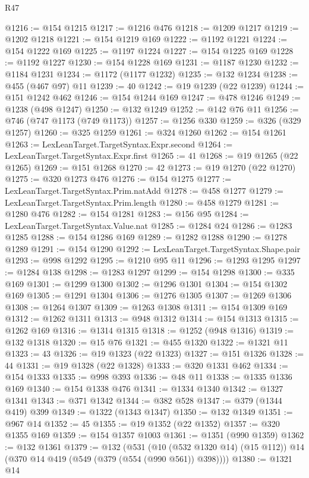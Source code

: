 \begin{lexlean}{R47}
\begin{coremodule}
@1216 := @154 @1215
@1217 := @1216 @476
@1218 := @1209 @1217
@1219 := @1202 @1218
@1221 := @154 @1219 @169
@1222 := @1192 @1221
@1224 := @154 @1222 @169
@1225 := @1197 @1224
@1227 := @154 @1225 @169
@1228 := @1192 @1227
@1230 := @154 @1228 @169
@1231 := @1187 @1230
@1232 := @1184 @1231
@1234 := @1172 (@1177 @1232)
@1235 := @132 @1234
@1238 := @455 (@467 @97) @11
@1239 := 40
@1242 := @19 @1239 (@22 @1239)
@1244 := @151 @1242 @462
@1246 := @154 @1244 @169
@1247 := @478 @1246
@1249 := @1238 (@498 @1247)
@1250 := @132 @1249
@1252 := @142 @76 @11
@1256 := @746 (@747 @1173 (@749 @1173))
@1257 := @1256 @330
@1259 := @326 (@329 @1257)
@1260 := @325 @1259
@1261 := @324 @1260
@1262 := @154 @1261
@1263 := LexLeanTarget.TargetSyntax.Expr.second
@1264 := LexLeanTarget.TargetSyntax.Expr.first
@1265 := 41
@1268 := @19 @1265 (@22 @1265)
@1269 := @151 @1268
@1270 := 42
@1273 := @19 @1270 (@22 @1270)
@1275 := @320 @1273 @476
@1276 := @154 @1275
@1277 := LexLeanTarget.TargetSyntax.Prim.natAdd
@1278 := @458 @1277
@1279 := LexLeanTarget.TargetSyntax.Prim.length
@1280 := @458 @1279
@1281 := @1280 @476
@1282 := @154 @1281
@1283 := @156 @95
@1284 := LexLeanTarget.TargetSyntax.Value.nat
@1285 := @1284 @24
@1286 := @1283 @1285
@1288 := @154 @1286 @169
@1289 := @1282 @1288
@1290 := @1278 @1289
@1291 := @154 @1290
@1292 := LexLeanTarget.TargetSyntax.Shape.pair
@1293 := @998 @1292
@1295 := @1210 @95 @11
@1296 := @1293 @1295
@1297 := @1284 @138
@1298 := @1283 @1297
@1299 := @154 @1298
@1300 := @335 @169
@1301 := @1299 @1300
@1302 := @1296 @1301
@1304 := @154 @1302 @169
@1305 := @1291 @1304
@1306 := @1276 @1305
@1307 := @1269 @1306
@1308 := @1264 @1307
@1309 := @1263 @1308
@1311 := @154 @1309 @169
@1312 := @1262 @1311
@1313 := @948 @1312
@1314 := @154 @1313
@1315 := @1262 @169
@1316 := @1314 @1315
@1318 := @1252 (@948 @1316)
@1319 := @132 @1318
@1320 := @15 @76
@1321 := @455 @1320
@1322 := @1321 @11
@1323 := 43
@1326 := @19 @1323 (@22 @1323)
@1327 := @151 @1326
@1328 := 44
@1331 := @19 @1328 (@22 @1328)
@1333 := @320 @1331 @462
@1334 := @154 @1333
@1335 := @998 @393
@1336 := @48 @11
@1338 := @1335 @1336 @169
@1340 := @154 @1338 @476
@1341 := @1334 @1340
@1342 := @1327 @1341
@1343 := @371 @1342
@1344 := @382 @528
@1347 := @379 (@1344 @419) @399
@1349 := @1322 (@1343 @1347)
@1350 := @132 @1349
@1351 := @967 @14
@1352 := 45
@1355 := @19 @1352 (@22 @1352)
@1357 := @320 @1355 @169
@1359 := @154 @1357 @1003
@1361 := @1351 (@990 @1359)
@1362 := @132 @1361
@1379 := @132
    (@531
      (@10 (@532 @1320 @14) (@15 @112))
      @14
      (@370 @14 @419 (@549 (@379 (@554 (@990 @561)) @398))))
@1380 := @1321 @14

\end{coremodule}
\end{lexlean}
